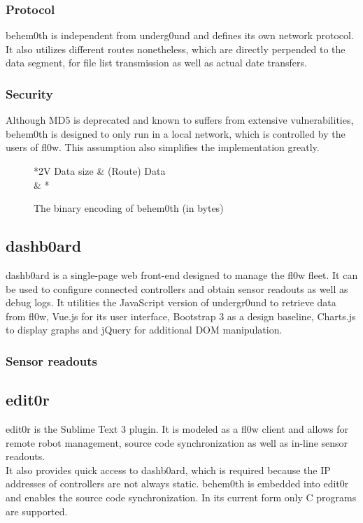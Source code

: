 \documentclass[conference]{IEEEtran}
\begin{document}
\subsubsection{Protocol}
behem0th is independent from underg0und and defines its own network protocol. It also utilizes different routes nonetheless, which are directly perpended to the data segment, for file list transmission as well as actual date transfers.\\

\subsubsection{Security}
Although MD5 is deprecated and known to suffers from extensive vulnerabilities, behem0th is designed to only run in a local network, which is controlled by the users of fl0w. This assumption also simplifies the implementation greatly.\\

\begin{figure}[H]
\centering
	\begin{tabular}{*{2}{V}}
		Data size & (Route) Data \\  & * \\
	\end{tabular}
	\caption{The binary encoding of behem0th (in bytes)}
\label{fig:behem0th_header}
\end{figure}


\subsection{dashb0ard}
dashb0ard is a single-page web front-end designed to manage the fl0w fleet. It can be used to configure connected controllers and obtain sensor readouts as well as debug logs. It utilities the JavaScript version of undergr0und to retrieve data from fl0w, Vue.js for its user interface, Bootstrap 3 as a design baseline, Charts.js to display graphs and jQuery\cite{jQuery:jQuery Foundation} for additional DOM manipulation.

\subsubsection{Sensor readouts}


\subsection{edit0r}
edit0r is the Sublime Text 3 plugin. It is modeled as a fl0w client and allows for remote robot management, source code synchronization as well as in-line sensor readouts. \\It also provides quick access to dashb0ard, which is required because the IP addresses of controllers are not always static. behem0th\cite{behem0th:Christoph Heiss} is embedded into edit0r and enables the source code synchronization. In its current form only C programs are supported.\\
\end{document}
